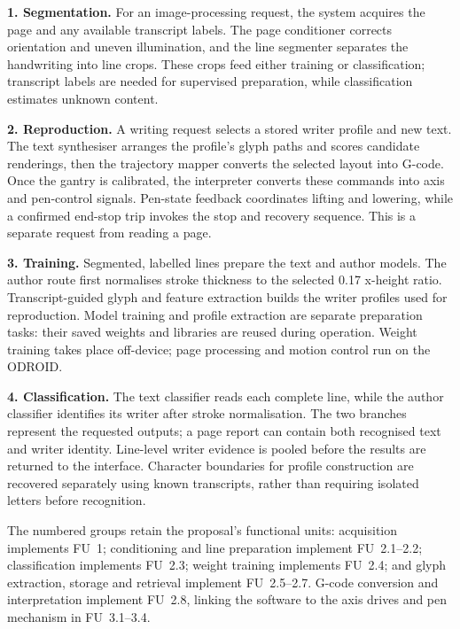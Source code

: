\noindent\textbf{1. Segmentation.} For an image-processing request, the system acquires the page and any available transcript labels. The page conditioner corrects orientation and uneven illumination, and the line segmenter separates the handwriting into line crops. These crops feed either training or classification; transcript labels are needed for supervised preparation, while classification estimates unknown content.

\noindent\textbf{2. Reproduction.} A writing request selects a stored writer profile and new text. The text synthesiser arranges the profile's glyph paths and scores candidate renderings, then the trajectory mapper converts the selected layout into G-code. Once the gantry is calibrated, the interpreter converts these commands into axis and pen-control signals. Pen-state feedback coordinates lifting and lowering, while a confirmed end-stop trip invokes the stop and recovery sequence. This is a separate request from reading a page.

\noindent\textbf{3. Training.} Segmented, labelled lines prepare the text and author models. The author route first normalises stroke thickness to the selected 0.17 x-height ratio. Transcript-guided glyph and feature extraction builds the writer profiles used for reproduction. Model training and profile extraction are separate preparation tasks: their saved weights and libraries are reused during operation. Weight training takes place off-device; page processing and motion control run on the ODROID.

\noindent\textbf{4. Classification.} The text classifier reads each complete line, while the author classifier identifies its writer after stroke normalisation. The two branches represent the requested outputs; a page report can contain both recognised text and writer identity. Line-level writer evidence is pooled before the results are returned to the interface. Character boundaries for profile construction are recovered separately using known transcripts, rather than requiring isolated letters before recognition.

The numbered groups retain the proposal's functional units: acquisition implements FU~1; conditioning and line preparation implement FU~2.1--2.2; classification implements FU~2.3; weight training implements FU~2.4; and glyph extraction, storage and retrieval implement FU~2.5--2.7. G-code conversion and interpretation implement FU~2.8, linking the software to the axis drives and pen mechanism in FU~3.1--3.4.
\FloatBarrier
